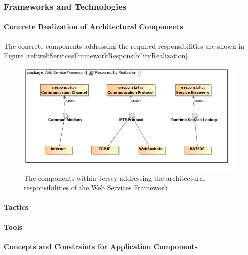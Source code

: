 \subsubsection{Frameworks and Technologies}
\paragraph{Concrete Realization of Architectural Components}
The concrete components addressing the required responsibilities are shown in Figure \ref{ref:webServicesFrameworkResponsibilityRealization}.
\begin{figure}[H]
	\begin{center}
	\includegraphics[scale=0.5]{../Diagrams and Charts/Web Services Framework/ResponsibilityRealization.jpg}
	\caption{The components within Jersey addressing the architectural responsibilities of the Web Services Framework}
	\label{fig:webServicesFrameworkResponsibilityRealization}
	\end{center}
\end{figure}

\paragraph{Tactics}
\paragraph{Tools}
\paragraph{Concepts and Constraints for Application Components}
